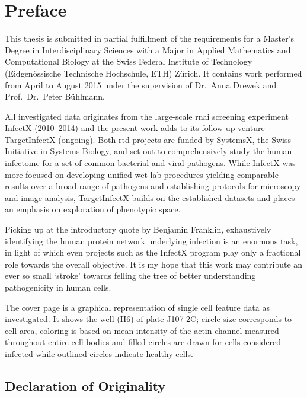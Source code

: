 \chapter{Preface}

This thesis is submitted in partial fulfillment of the requirements for a Master's Degree in Interdisciplinary Sciences with a Major in Applied Mathematics and Computational Biology at the Swiss Federal Institute of Technology (Eidgenössische Technische Hochschule, ETH) Z\"urich. It contains work performed from April to August 2015 under the supervision of Dr.\ Anna Drewek and Prof.\ Dr.\ Peter B\"uhlmann.

All investigated data originates from the large-scale \acrfull{rnai} screening experiment \href{http://www.infectx.ch}{InfectX} (2010--2014) and the present work adds to its follow-up venture \href{http://www.targetinfectx.ch}{TargetInfectX} (ongoing). Both \acrfull{rtd} projects are funded by \href{http://www.systemsx.ch}{SystemsX}, the Swiss Initiative in Systems Biology, and set out to comprehensively study the human infectome for a set of common bacterial and viral pathogens. While InfectX was more focused on developing unified wet-lab procedures yielding comparable results over a broad range of pathogens and establishing protocols for microscopy and image analysis, TargetInfectX builds on the established datasets and places an emphasis on exploration of phenotypic space.

Picking up at the introductory quote by Benjamin Franklin, exhaustively identifying the human protein network underlying infection is an enormous task, in light of which even projects such as the InfectX program play only a fractional role towards the overall objective. It is my hope that this work may contribute an ever so small `stroke' towards felling the tree of better understanding pathogenicity in human cells.

The cover page is a graphical representation of single cell feature data as investigated. It shows the  well (H6) of plate J107-2C; circle size corresponds to cell area, coloring is based on mean intensity of the actin channel measured throughout entire cell bodies and filled circles are drawn for cells considered infected while outlined circles indicate healthy cells.

\section*{Declaration of Originality}

